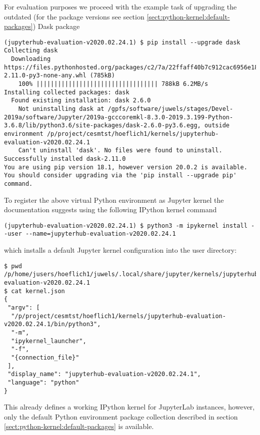 For evaluation purposes we proceed with the example task of upgrading the outdated (for the package versions see section \ref{sect:python-kernel:default-packages}) Dask package
%
\begin{verbatim}
(jupyterhub-evaluation-v2020.02.24.1) $ pip install --upgrade dask
Collecting dask
  Downloading https://files.pythonhosted.org/packages/c2/7a/22ffaff40b7c912cac6956e18d38c686b6b5756179e9c09e8e6bf7810aad/dask-2.11.0-py3-none-any.whl (785kB)
    100% |||||||||||||||||||||||||||||||||| 788kB 6.2MB/s
Installing collected packages: dask
  Found existing installation: dask 2.6.0
    Not uninstalling dask at /gpfs/software/juwels/stages/Devel-2019a/software/Jupyter/2019a-gcccoremkl-8.3.0-2019.3.199-Python-3.6.8/lib/python3.6/site-packages/dask-2.6.0-py3.6.egg, outside environment /p/project/cesmtst/hoeflich1/kernels/jupyterhub-evaluation-v2020.02.24.1
    Can't uninstall 'dask'. No files were found to uninstall.
Successfully installed dask-2.11.0
You are using pip version 18.1, however version 20.0.2 is available.
You should consider upgrading via the 'pip install --upgrade pip' command.
\end{verbatim}

To register the above virtual Python environment as Jupyter kernel the documentation suggests using the following IPython kernel command
%
\begin{verbatim}
(jupyterhub-evaluation-v2020.02.24.1) $ python3 -m ipykernel install --user --name=jupyterhub-evaluation-v2020.02.24.1
\end{verbatim}
%
which installs a default Jupyter kernel configuration into the user directory:
%
\begin{verbatim}
$ pwd
/p/home/jusers/hoeflich1/juwels/.local/share/jupyter/kernels/jupyterhub-evaluation-v2020.02.24.1
$ cat kernel.json
{
 "argv": [
  "/p/project/cesmtst/hoeflich1/kernels/jupyterhub-evaluation-v2020.02.24.1/bin/python3",
  "-m",
  "ipykernel_launcher",
  "-f",
  "{connection_file}"
 ],
 "display_name": "jupyterhub-evaluation-v2020.02.24.1",
 "language": "python"
}
\end{verbatim}

This already defines a working IPython kernel for JupyterLab instances, however, only the default Python environment package collection described in section \ref{sect:python-kernel:default-packages} is available.

